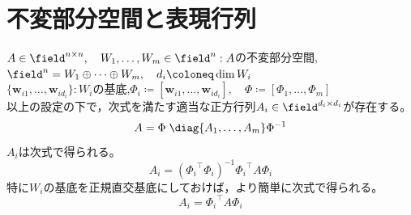     \section{不変部分空間と表現行列}
        \label{不変部分空間と表現行列}
        \begin{shadebox}
            $A\in\field^{n\times n},\quad W_1,\dotsc,W_m\in\field^n : A$の不変部分空間,\quad$\field^n = W_1\oplus\dotsb\oplus W_m,\quad d_i \coloneq \dim{W_i}$\\
            $\{\bm{w}_{i1},\dotsc,\bm{w}_{id_i}\} : W_i$の基底,\quad$\Phi_i \coloneq [\bm{w}_{i1},\dotsc,\bm{w}_{id_i}],\quad \Phi \coloneq [\Phi_1,\dotsc,\Phi_m]$\\
            以上の設定の下で，次式を満たす適当な正方行列$A_i\in\field^{d_i\times d_i}$が存在する。
            \[A = \Phi\;\diag{A_1,\dotsc,A_m}\Phi^{-1}\]
            $A_i$は次式で得られる。
            \[A_i = \left({\Phi_i}^\top\Phi_i\right)^{-1}{\Phi_i}^\top A\Phi_i\]
            特に$W_i$の基底を正規直交基底にしておけば，より簡単に次式で得られる。
            \[A_i = {\Phi_i}^\top A\Phi_i\]
        \end{shadebox}
